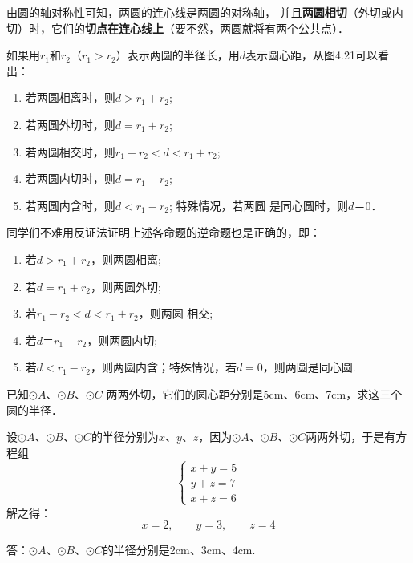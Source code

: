 由圆的轴对称性可知，两圆的连心线是两圆的对称轴，
并且\textbf{两圆相切}（外切或内切）时，它们的\textbf{切点在连心线上}（要不然，两圆就将有两个公共点）．



如果用$r_1$和$r_2$（$r_1>r_2$）表示两圆的半径长，用$d$表示圆心距，从图4.21可以看出：
\begin{enumerate}
\item 若两圆相离时，则$d>r_1+r_2$;
\item 若两圆外切时，则$d=r_1+r_2$;
\item 若两圆相交时，则$r_1-r_2<d<r_1+r_2$;
\item 若两圆内切时，则$d=r_1-r_2$;
\item 若两圆内含时，则$d<r_1-r_2$; 特殊情况，若两圆
是同心圆时，则$d＝0$．
\end{enumerate}

同学们不难用反证法证明上述各命题的逆命题也是正确的，即：
\begin{enumerate}
  \item 若$d>r_1+r_2$，则两圆相离;
\item 若$d=r_1+r_2$，则两圆外切;
\item 若$r_1-r_2<d<r_1+r_2$，则两圆
相交;
\item  若$d＝r_1-r_2$，则两圆内切;
\item 若$d<r_1-r_2$，则两圆内含；特殊情况，若$d=0$，则两圆是同心圆.
\end{enumerate}

\begin{example}
已知$\odot A$、$\odot B$、$\odot C$
  两两外切，它们的圆心距分别是5cm、6cm、7cm，求这三个圆的半径．
\end{example}

\begin{figure}[htp]
  \centering
{}
  \caption{}
\end{figure}


\begin{solution}
设$\odot A$、$\odot B$、$\odot C$的半径分别为$x$、$y$、$z$，因为$\odot A$、$\odot B$、$\odot C$两两外切，于是有方程组
\[\begin{cases}
  x+y=5\\
  y+z=7\\
  x+z=6
\end{cases}\]
解之得：
\[x=2,\qquad y=3,\qquad z=4\]

答：$\odot A$、$\odot B$、$\odot C$的半径分别是2cm、3cm、4cm.
\end{solution}


